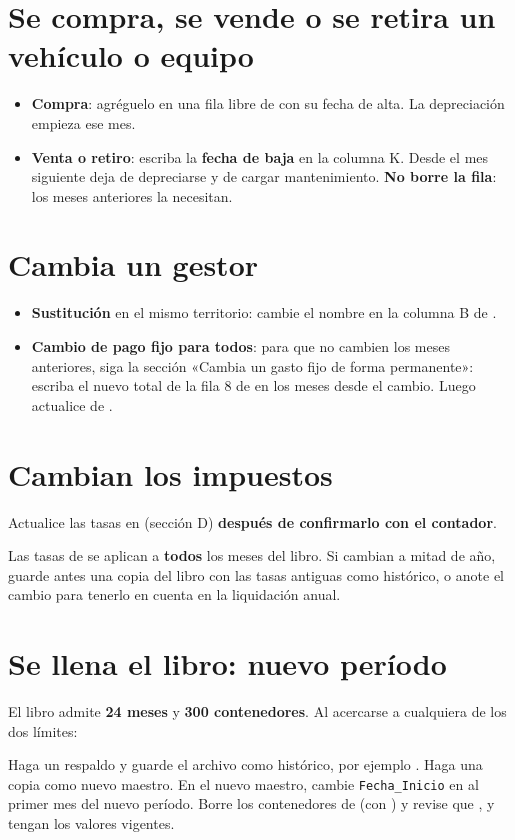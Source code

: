 \section{Se compra, se vende o se retira un vehículo o equipo}
\begin{itemize}
  \item \textbf{Compra}: agréguelo en una fila libre de  con su fecha de alta. La depreciación empieza ese mes.
  \item \textbf{Venta o retiro}: escriba la \textbf{fecha de baja} en la columna K. Desde el mes siguiente deja de depreciarse y de cargar mantenimiento.
        \textbf{No borre la fila}: los meses anteriores la necesitan.
\end{itemize}

\section{Cambia un gestor}
\begin{itemize}
  \item \textbf{Sustitución} en el mismo territorio: cambie el nombre en la columna B de .
  \item \textbf{Cambio de pago fijo para todos}: para que no cambien los meses anteriores, siga la sección «Cambia un gasto fijo de forma
        permanente»: escriba el nuevo total de la fila 8 de  en los meses desde el cambio. Luego actualice  de .
\end{itemize}

\section{Cambian los impuestos}
Actualice las tasas en  (sección D) \textbf{después de confirmarlo con el contador}.

\begin{atencion}
Las tasas de  se aplican a \textbf{todos} los meses del libro. Si cambian a mitad de año, guarde antes una copia del libro con
las tasas antiguas como histórico, o anote el cambio para tenerlo en cuenta en la liquidación anual.
\end{atencion}

\section{Se llena el libro: nuevo período}
El libro admite \textbf{24 meses} y \textbf{300 contenedores}. Al acercarse a cualquiera de los dos límites:
\begin{pasos}
\paso Haga un respaldo y guarde el archivo como histórico, por ejemplo .
\paso Haga una copia como nuevo maestro.
\paso En el nuevo maestro, cambie \texttt{Fecha\_Inicio} en  al primer mes del nuevo período.
\paso Borre los contenedores de  (con ) y revise que ,  y 
      tengan los valores vigentes.
\end{pasos}

